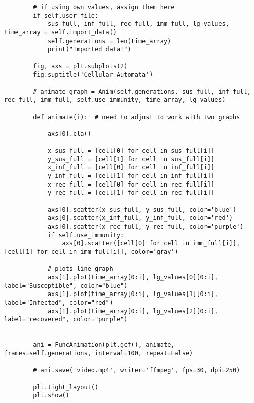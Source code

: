 \documentclass[11pt, a4paper]{article}
\begin{document}
\begin{lstlisting}
        # if using own values, assign them here
        if self.user_file:
            sus_full, inf_full, rec_full, imm_full, lg_values, time_array = self.import_data()
            self.generations = len(time_array)
            print("Imported data!")

        fig, axs = plt.subplots(2)
        fig.suptitle('Cellular Automata')

        # animate_graph = Anim(self.generations, sus_full, inf_full, rec_full, imm_full, self.use_immunity, time_array, lg_values)

        def animate(i):  # need to adjust to work with two graphs

            axs[0].cla()

            x_sus_full = [cell[0] for cell in sus_full[i]]
            y_sus_full = [cell[1] for cell in sus_full[i]]
            x_inf_full = [cell[0] for cell in inf_full[i]]
            y_inf_full = [cell[1] for cell in inf_full[i]]
            x_rec_full = [cell[0] for cell in rec_full[i]]
            y_rec_full = [cell[1] for cell in rec_full[i]]

            axs[0].scatter(x_sus_full, y_sus_full, color='blue')
            axs[0].scatter(x_inf_full, y_inf_full, color='red')
            axs[0].scatter(x_rec_full, y_rec_full, color='purple')
            if self.use_immunity:
                axs[0].scatter([cell[0] for cell in imm_full[i]], [cell[1] for cell in imm_full[i]], color='gray')

            # plots line graph
            axs[1].plot(time_array[0:i], lg_values[0][0:i], label="Susceptible", color="blue")
            axs[1].plot(time_array[0:i], lg_values[1][0:i], label="Infected", color="red")
            axs[1].plot(time_array[0:i], lg_values[2][0:i], label="recovered", color="purple")


        ani = FuncAnimation(plt.gcf(), animate, frames=self.generations, interval=100, repeat=False)

        # ani.save('video.mp4', writer='ffmpeg', fps=30, dpi=250)

        plt.tight_layout()
        plt.show()
    
\end{lstlisting}
\newpage
\end{document}
